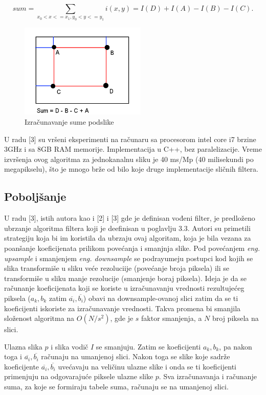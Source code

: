 \documentclass[a4paper,12pt,titlepage]{article}
\begin{document}
\begin{equation}\label{eq:gf19}
sum = \sum_{x_0 < x <= x_1, y_0 < y <= y_1} i(x, y) = I(D) + I(A) - I(B) - I(C).
\end{equation} 

\begin{figure}[ht!]
\centering
\includegraphics[width=60mm]{img/sat.png}
\caption{Izračunavanje sume podslike}
\label{overflow}
\end{figure}

U radu [3] su vršeni eksperimenti na računaru sa procesorom intel core i7 brzine 3GHz i sa 8GB RAM memorije. Implementacija u C++, bez paralelizacije. Vreme izvršenja ovog algoritma za jednokanalnu sliku je 40 ms/Mp (40 milisekundi po megapikselu), što je mnogo brže od bilo koje druge implementacije sličnih filtera.  

\subsection{Poboljšanje}%

U radu [3], istih autora kao i [2] i [3] gde je definisan vođeni filter, je predloženo ubrzanje algoritma filtera koji je deefinisan u poglavlju 3.3. Autori su primetili strategiju koja bi im koristila da ubrzaju ovaj algoritam, koja je bila vezana za poanšanje koeficijenata prilikom povećanja i smanjnja slike. Pod povećanjem \emph{eng. upsample} i smanjenjem \emph{eng. downsample} se podrayumeju postupci kod kojih se slika transformiše u sliku veće rezoluciije (povećanje broja piksela) ili se transformiše u sliku manje rezolucije (smanjenje boraj piksela). Ideja je da se računanje koeficijenata koji se koriste u izračunavanju vrednosti rezultujećeg piksela ($a_k, b_k$ zatim $\overline{a_i}, \overline{b_i}$) obavi na downsample-ovanoj slici zatim da se ti koeficijenti iskoriste za izračunavanje vrednosti. Takva promena bi smanjila složenost algoritma na $O(N / s^2)$, gde je $s$ faktor smanjenja, a $N$ broj piksela na slici. 

Ulazna slika $p$ i slika vodič $I$ se smanjuju. Zatim se koeficijenti $a_k, b_k$, pa nakon toga i $\overline{a_i}, \overline{b_i}$ računaju na umanjenoj slici. Nakon toga se slike koje sadrže koeficijente $\overline{a_i}, \overline{b_i}$ uvećavaju na veličinu ulazne slike i onda se ti koeficijenti primenjuju na odgovarajuće piksele ulazne slike $p$. Sva izračunavanja i računanje suma, za koje se formiraju tabele suma, računaju se na umanjenoj slici.
\end{document}

